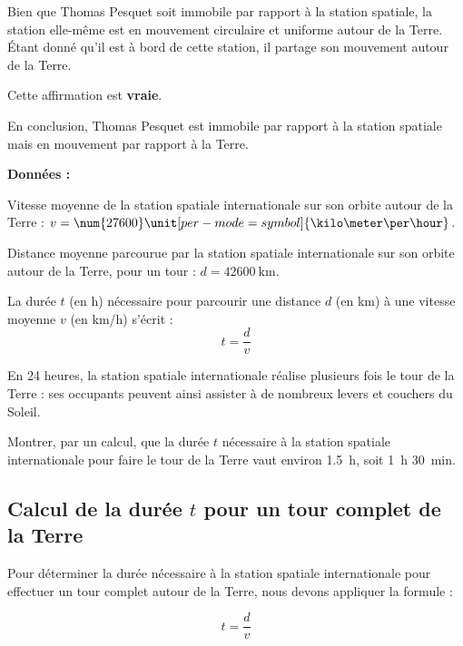 \documentclass[answers]{exam}
\begin{document}
\begin{questions}
\begin{solution}
\begin{compactitem}
Bien que Thomas Pesquet soit immobile par rapport à la station spatiale, la station elle-même est en mouvement circulaire et uniforme autour de la Terre. Étant donné qu'il est à bord de cette station, il partage son mouvement autour de la Terre. 

Cette affirmation est \textbf{vraie}.
\end{compactitem}

En conclusion, Thomas Pesquet est immobile par rapport à la station spatiale mais en mouvement par rapport à la Terre.
\end{solution}

\question[4] \textbf{Données :}
  
  \begin{compactitem}
  \item Vitesse moyenne de la station spatiale internationale sur son orbite autour de la Terre : $v = \num{27600} \unit[per-mode = symbol]{\kilo\meter\per\hour}$.
  \item Distance moyenne parcourue par la station spatiale internationale sur son orbite autour de la Terre, pour un tour : $d = \SI{42600}{\kilo\meter}$.
  \item La durée $t$ (en h) nécessaire pour parcourir une distance $d$ (en km) à une vitesse moyenne $v$ (en \unit[per-mode = symbol]{\kilo\meter\per\hour}) s'écrit :
  \[
  t = \frac{d}{v}
  \]
  \end{compactitem}
  
  En 24 heures, la station spatiale internationale réalise plusieurs fois le tour de la Terre : ses occupants peuvent ainsi assister à de nombreux levers et couchers du Soleil.
  
  Montrer, par un calcul, que la durée $t$ nécessaire à la station spatiale internationale pour faire le tour de la Terre vaut environ \SI{1.5}{\hour}, soit \SI{1}{\hour} \SI{30}{\minute}.
  
  

\begin{solution}
\subsection*{Calcul de la durée $t$ pour un tour complet de la Terre}

Pour déterminer la durée nécessaire à la station spatiale internationale pour effectuer un tour complet autour de la Terre, nous devons appliquer la formule :

\[
t = \frac{d}{v}
\]


\end{solution}
\end{questions}
\end{document}
